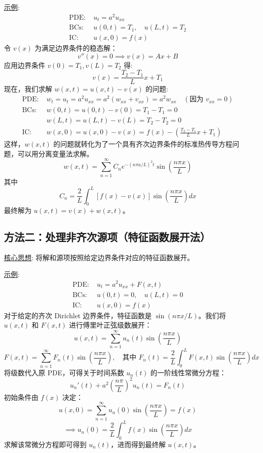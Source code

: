 \documentclass{article}
\begin{document}
	\underline{示例}:
	\begin{align*}
		\text{PDE: } & u_t = a^2 u_{xx} \\
		\text{BCs: } & u(0,t) = T_1, \quad u(L,t) = T_2 \\
		\text{IC: }  & u(x,0) = f(x)
	\end{align*}
	令 $v(x)$ 为满足边界条件的稳态解：
	$$
	v''(x)=0 \implies v(x) = Ax+B
	$$
	应用边界条件 $v(0)=T_1, v(L)=T_2$ 得:
	$$
	v(x) = \frac{T_2-T_1}{L}x + T_1
	$$
	现在，我们求解 $w(x,t) = u(x,t) - v(x)$ 的问题:
	\begin{align*}
		\text{PDE: } & w_t = u_t = a^2 u_{xx} = a^2 (w_{xx} + v_{xx}) = a^2 w_{xx} \quad (\text{因为 } v_{xx}=0) \\
		\text{BCs: } & w(0,t) = u(0,t) - v(0) = T_1 - T_1 = 0 \\
		& w(L,t) = u(L,t) - v(L) = T_2 - T_2 = 0 \\
		\text{IC: }  & w(x,0) = u(x,0) - v(x) = f(x) - \left( \frac{T_2-T_1}{L}x + T_1 \right)
	\end{align*}
	这样，$w(x,t)$ 的问题就转化为了一个具有齐次边界条件的标准热传导方程问题，可以用分离变量法求解。
	$$
	w(x,t) = \sum_{n=1}^{\infty} C_n e^{-(n\pi a/L)^2 t} \sin\left(\frac{n\pi x}{L}\right)
	$$
	其中
	$$
	C_n = \frac{2}{L} \int_0^L \left[ f(x) - v(x) \right] \sin\left(\frac{n\pi x}{L}\right) dx
	$$
	最终解为 $u(x,t) = v(x) + w(x,t)$。
	
	\subsection*{方法二：处理非齐次源项（特征函数展开法）}
	\underline{核心思想}: 将解和源项按照给定边界条件对应的特征函数展开。
	
	\underline{示例}:
	\begin{align*}
		\text{PDE: } & u_t = a^2 u_{xx} + F(x,t) \\
		\text{BCs: } & u(0,t) = 0, \quad u(L,t) = 0 \\
		\text{IC: }  & u(x,0) = f(x)
	\end{align*}
	对于给定的齐次 Dirichlet 边界条件，特征函数是 $\sin(n\pi x/L)$。我们将 $u(x,t)$ 和 $F(x,t)$ 进行傅里叶正弦级数展开：
	$$
	u(x,t) = \sum_{n=1}^{\infty} u_n(t) \sin\left(\frac{n\pi x}{L}\right)
	$$
	$$
	F(x,t) = \sum_{n=1}^{\infty} F_n(t) \sin\left(\frac{n\pi x}{L}\right), \quad \text{其中 } F_n(t) = \frac{2}{L}\int_0^L F(x,t)\sin\left(\frac{n\pi x}{L}\right)dx
	$$
	将级数代入原 PDE，可得关于时间系数 $u_n(t)$ 的一阶线性常微分方程：
	$$
	u_n'(t) + a^2\left(\frac{n\pi}{L}\right)^2 u_n(t) = F_n(t)
	$$
	初始条件由 $f(x)$ 决定：
	$$
	u(x,0) = \sum_{n=1}^{\infty} u_n(0) \sin\left(\frac{n\pi x}{L}\right) = f(x)
	$$
	$$
	\implies u_n(0) = \frac{2}{L}\int_0^L f(x)\sin\left(\frac{n\pi x}{L}\right)dx
	$$
	求解该常微分方程即可得到 $u_n(t)$，进而得到最终解 $u(x,t)$。
\end{document}
